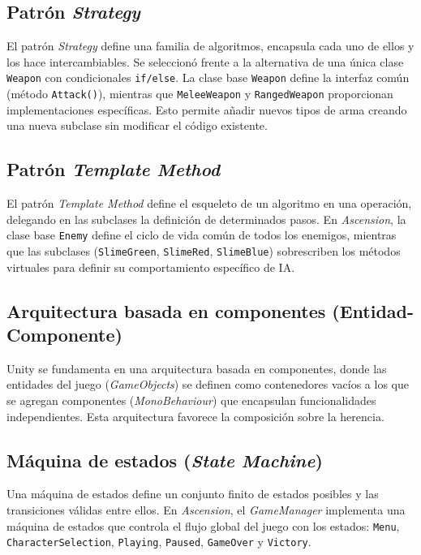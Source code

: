 \subsection{Patrón \textit{Strategy}}


El patrón \textit{Strategy} define una familia de algoritmos, encapsula cada uno de ellos y los hace intercambiables. Se seleccionó frente a la alternativa de una única clase \texttt{Weapon} con condicionales \texttt{if/else}. La clase base \texttt{Weapon} define la interfaz común (método \texttt{Attack()}), mientras que \texttt{MeleeWeapon} y \texttt{RangedWeapon} proporcionan implementaciones específicas. Esto permite añadir nuevos tipos de arma creando una nueva subclase sin modificar el código existente.

\subsection{Patrón \textit{Template Method}}


El patrón \textit{Template Method} define el esqueleto de un algoritmo en una operación, delegando en las subclases la definición de determinados pasos. En \textit{Ascension}, la clase base \texttt{Enemy}  define el ciclo de vida común de todos los enemigos, mientras que las subclases (\texttt{SlimeGreen}, \texttt{SlimeRed}, \texttt{SlimeBlue}) sobrescriben los métodos virtuales para definir su comportamiento específico de IA.

\subsection{Arquitectura basada en componentes (Entidad-Componente)}


Unity se fundamenta en una arquitectura basada en componentes, donde las entidades del juego (\textit{GameObjects}) se definen como contenedores vacíos a los que se agregan componentes (\textit{MonoBehaviour}) que encapsulan funcionalidades independientes. Esta arquitectura favorece la composición sobre la herencia.

\subsection{Máquina de estados (\textit{State Machine})}


Una máquina de estados define un conjunto finito de estados posibles y las transiciones válidas entre ellos. En \textit{Ascension}, el \textit{GameManager} implementa una máquina de estados que controla el flujo global del juego con los estados: \texttt{Menu}, \texttt{CharacterSelection}, \texttt{Playing}, \texttt{Paused}, \texttt{GameOver} y \texttt{Victory}.



